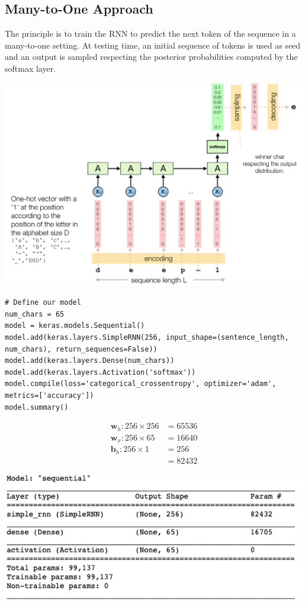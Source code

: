 \documentclass[11pt]{article}
\begin{document}
\subsection{Many-to-One Approach}
The principle is to train the RNN to predict the next token of the sequence in a many-to-one setting. At testing time, an initial sequence of tokens is used as seed and an output is sampled respecting the posterior probabilities computed by the softmax layer.

\begin{center}
	\includegraphics[width=0.6\linewidth]{img/generative_rnn_manytoone}
\end{center}

\begin{verbatim}
# Define our model
num_chars = 65
model = keras.models.Sequential()
model.add(keras.layers.SimpleRNN(256, input_shape=(sentence_length, num_chars), return_sequences=False))
model.add(keras.layers.Dense(num_chars))
model.add(keras.layers.Activation('softmax'))
model.compile(loss='categorical_crossentropy', optimizer='adam', metrics=['accuracy'])
model.summary()
\end{verbatim}
\begin{minipage}{0.3\linewidth}
	\begin{align*}
		\textbf{w}_h: 256\times 256 &= 65536\\
		\textbf{w}_x: 256\times 65 &= 16640\\
		\textbf{b}_h: 256\times 1 &= 256\\
		&= 82432
	\end{align*}
\end{minipage}
\begin{minipage}{0.7\linewidth}
	\begin{center}
		\includegraphics[width=\linewidth]{img/generative_rnn_manytoone_summary}
	\end{center}

\end{minipage}
\end{document}
